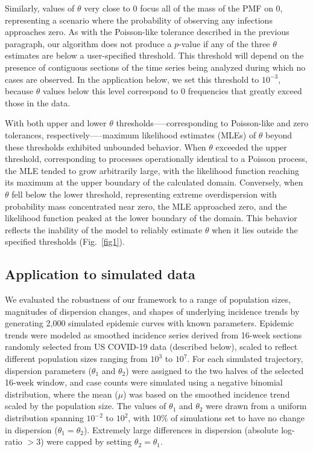 \documentclass[11pt,letterpaper]{article}
\begin{document}
\begin{Abstract}
Similarly, values of $\theta$ very close to 0 focus all of the mass of the PMF on 0, representing a scenario where the probability of observing any infections approaches zero. As with the Poisson-like tolerance described in the previous paragraph, our algorithm does not produce a $p$-value if any of the three $\theta$ estimates are below a user-specified threshold. This threshold will depend on the presence of contiguous sections of the time series being analyzed during which no cases are observed. In the application below, we set this threshold to $10^{-3}$, because $\theta$ values below this level correspond to 0 frequencies that greatly exceed those in the data.

With both upper and lower $\theta$ thresholds--—corresponding to Poisson-like and zero tolerances, respectively—--maximum likelihood estimates (MLEs) of $\theta$ beyond these thresholds exhibited unbounded behavior. When $\theta$ exceeded the upper threshold, corresponding to processes operationally identical to a Poisson process, the MLE tended to grow arbitrarily large, with the likelihood function reaching its maximum at the upper boundary of the calculated domain. Conversely, when $\theta$ fell below the lower threshold, representing extreme overdispersion with probability mass concentrated near zero, the MLE approached zero, and the likelihood function peaked at the lower boundary of the domain. This behavior reflects the inability of the model to reliably estimate $\theta$ when it lies outside the specified thresholds (Fig.~\ref{fig1}).

\subsection*{Application to simulated data}
We evaluated the robustness of our framework to a range of population sizes, magnitudes of dispersion changes, and shapes of underlying incidence trends by generating 2,000 simulated epidemic curves with known parameters. 
Epidemic trends were modeled as smoothed incidence series derived from 16-week sections randomly selected from US COVID-19 data (described below), scaled to reflect different population sizes ranging from $10^3$ to $10^7$. 
For each simulated trajectory, dispersion parameters ($\theta_1$ and $\theta_2$) were assigned to the two halves of the selected 16-week window, and case counts were simulated using a negative binomial distribution, where the mean ($\mu$) was based on the smoothed incidence trend scaled by the population size. 
The values of $\theta_1$ and $\theta_2$ were drawn from a uniform distribution spanning $10^{-2}$ to $10^{2}$, with 10\% of simulations set to have no change in dispersion ($\theta_1 = \theta_2$). 
Extremely large differences in dispersion (absolute log-ratio $>3$) were capped by setting $\theta_2 = \theta_1$. 


\end{Abstract}
\end{document}
